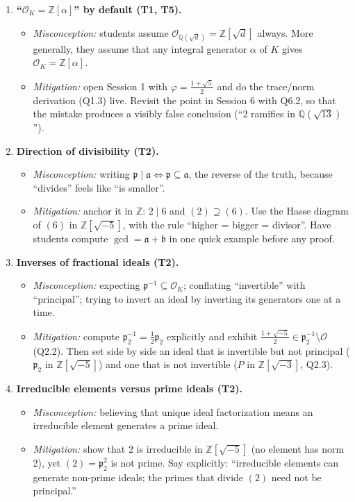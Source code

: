 \documentclass[11pt]{article}
\newcommand{\Z}{\mathbb{Z}}
\newcommand{\Q}{\mathbb{Q}}
\newcommand{\OK}{\mathcal{O}_K}
\newcommand{\cO}{\mathcal{O}}
\newcommand{\fp}{\mathfrak{p}}
\newcommand{\fa}{\mathfrak{a}}
\newcommand{\fb}{\mathfrak{b}}
\begin{document}
\begin{enumerate}[label=\textbf{D\arabic*.}]
  \item \textbf{``$\OK=\Z[\alpha]$'' by default (T1, T5).}
  \begin{itemize}
    \item \emph{Misconception:} students assume $\cO_{\Q(\sqrt d)}=\Z[\sqrt d]$ always. More generally, they assume that any integral generator $\alpha$ of $K$ gives $\OK=\Z[\alpha]$.
    \item \emph{Mitigation:} open Session 1 with $\varphi=\frac{1+\sqrt5}{2}$ and do the trace/norm derivation (Q1.3) live. Revisit the point in Session 6 with Q6.2, so that the mistake produces a visibly false conclusion (``2 ramifies in $\Q(\sqrt{13})$'').
  \end{itemize}

  \item \textbf{Direction of divisibility (T2).}
  \begin{itemize}
    \item \emph{Misconception:} writing $\fp\mid\fa\iff\fp\subseteq\fa$, the reverse of the truth, because ``divides'' feels like ``is smaller''.
    \item \emph{Mitigation:} anchor it in $\Z$: $2\mid6$ and $(2)\supseteq(6)$. Use the Hasse diagram of $(6)$ in $\Z[\sqrt{-5}]$, with the rule ``higher = bigger = divisor''. Have students compute $\gcd=\fa+\fb$ in one quick example before any proof.
  \end{itemize}

  \item \textbf{Inverses of fractional ideals (T2).}
  \begin{itemize}
    \item \emph{Misconception:} expecting $\fp^{-1}\subseteq\OK$; conflating ``invertible'' with ``principal''; trying to invert an ideal by inverting its generators one at a time.
    \item \emph{Mitigation:} compute $\fp_2^{-1}=\frac12\fp_2$ explicitly and exhibit $\frac{1+\sqrt{-5}}2\in\fp_2^{-1}\setminus\cO$ (Q2.2). Then set side by side an ideal that is invertible but not principal ($\fp_2$ in $\Z[\sqrt{-5}]$) and one that is not invertible ($P$ in $\Z[\sqrt{-3}]$, Q2.3).
  \end{itemize}

  \item \textbf{Irreducible elements versus prime ideals (T2).}
  \begin{itemize}
    \item \emph{Misconception:} believing that unique ideal factorization means an irreducible element generates a prime ideal.
    \item \emph{Mitigation:} show that 2 is irreducible in $\Z[\sqrt{-5}]$ (no element has norm 2), yet $(2)=\fp_2^2$ is not prime. Say explicitly: ``irreducible elements can generate non-prime ideals; the primes that divide $(2)$ need not be principal.''
  \end{itemize}


\end{enumerate}
\end{document}
